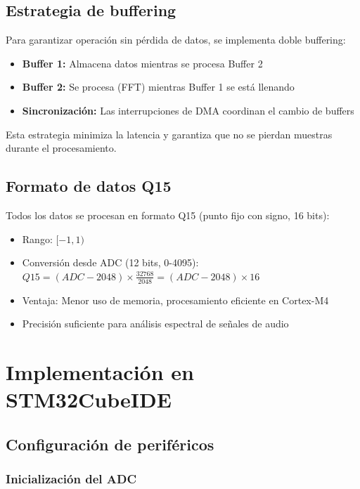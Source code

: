 \documentclass[12pt]{article}
\begin{document}
		\subsection{Estrategia de buffering}

			Para garantizar operación sin pérdida de datos, se implementa doble buffering:

			\begin{itemize}
				\item \textbf{Buffer 1:} Almacena datos mientras se procesa Buffer 2
				\item \textbf{Buffer 2:} Se procesa (FFT) mientras Buffer 1 se está llenando
				\item \textbf{Sincronización:} Las interrupciones de DMA coordinan el cambio de buffers
			\end{itemize}

			Esta estrategia minimiza la latencia y garantiza que no se pierdan muestras durante el procesamiento.

		\subsection{Formato de datos Q15}

			Todos los datos se procesan en formato Q15 (punto fijo con signo, 16 bits):

			\begin{itemize}
				\item Rango: $[-1, 1)$
				\item Conversión desde ADC (12 bits, 0-4095): $Q15 = (ADC - 2048) \times \frac{32768}{2048} = (ADC - 2048) \times 16$
				\item Ventaja: Menor uso de memoria, procesamiento eficiente en Cortex-M4
				\item Precisión suficiente para análisis espectral de señales de audio
			\end{itemize}


	\section{Implementación en STM32CubeIDE}

		\subsection{Configuración de periféricos}

			\subsubsection{Inicialización del ADC}
\end{document}
